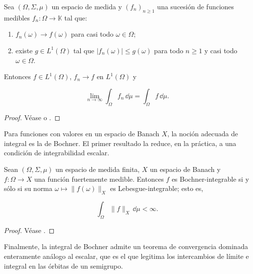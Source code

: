 \begin{Teorema}
\label{ch:preliminares:th:dominada}

Sea $(\Omega, \Sigma, \mu)$ un espacio de medida y $(f_n)_{n \geq 1}$ una sucesión
de funciones medibles $f_n : \Omega \rightarrow \mathbb{K}$ tal que:

\begin{enumerate}
    \item $f_n(\omega) \rightarrow f(\omega)$ para casi todo $\omega \in \Omega$;
    \item existe $g \in L^1(\Omega)$ tal que $|f_n(\omega)| \leq g(\omega)$ para
    todo $n \geq 1$ y casi todo $\omega \in \Omega$.
\end{enumerate}

Entonces $f \in L^1(\Omega)$, $f_n \rightarrow f$ en $L^1(\Omega)$ y

\[\lim_{n \rightarrow \infty} \int_\Omega f_n \, \dd \mu = \int_\Omega f \, \dd \mu.\]
\end{Teorema}

\begin{proof}
Véase \cite[Teorema~4.2]{brezis-2011-fun-ana-sob} o
\cite[Theorem~2.24]{folland_1999_real}.
\end{proof}

Para funciones con valores en un espacio de Banach $X$, la noción adecuada de
integral es la de Bochner. El primer resultado la reduce, en la práctica, a una
condición de integrabilidad escalar.\\

\begin{Teorema}
\label{ch:preliminares:th:bochner}

Sean $(\Omega, \Sigma, \mu)$ un espacio de medida finita, $X$ un espacio de
Banach y $f : \Omega \rightarrow X$ una función fuertemente medible. Entonces $f$
es Bochner-integrable si y sólo si su norma
$\omega \mapsto \lVert f(\omega) \rVert_X$ es Lebesgue-integrable; esto es,

\[\int_\Omega \lVert f \rVert_X \, \dd \mu < \infty.\]
\end{Teorema}

\begin{proof}
Véase \cite[Cap.~V, \S 5, Teorema~1]{yosida-1980-fun-ana}.
\end{proof}

Finalmente, la integral de Bochner admite un teorema de convergencia dominada
enteramente análogo al escalar, que es el que legitima los intercambios de
límite e integral en las órbitas de un semigrupo.\\

